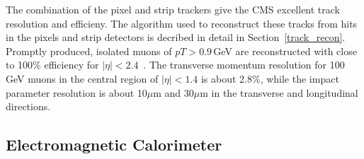 The combination of the pixel and strip trackers give the CMS excellent track resolution and efficieny. The algorithm used to reconstruct these tracks from hits in the pixels and strip detectors is decribed in detail in Section~\ref{track_recon}.  Promptly  produced,  isolated  muons  of $pT>0.9$\,GeV are reconstructed with close to 100\% efficiency for $|\eta|<2.4$~\cite{track_reconstruction}. The transverse momentum resolution for 100\,GeV muons in the central region of $|\eta|<1.4$ is about 2.8\%, while the impact parameter resolution is about 10$\mu$m and 30$\mu$m in the transverse and longitudinal directions.


\subsection{Electromagnetic Calorimeter}
\label{Ecal}
